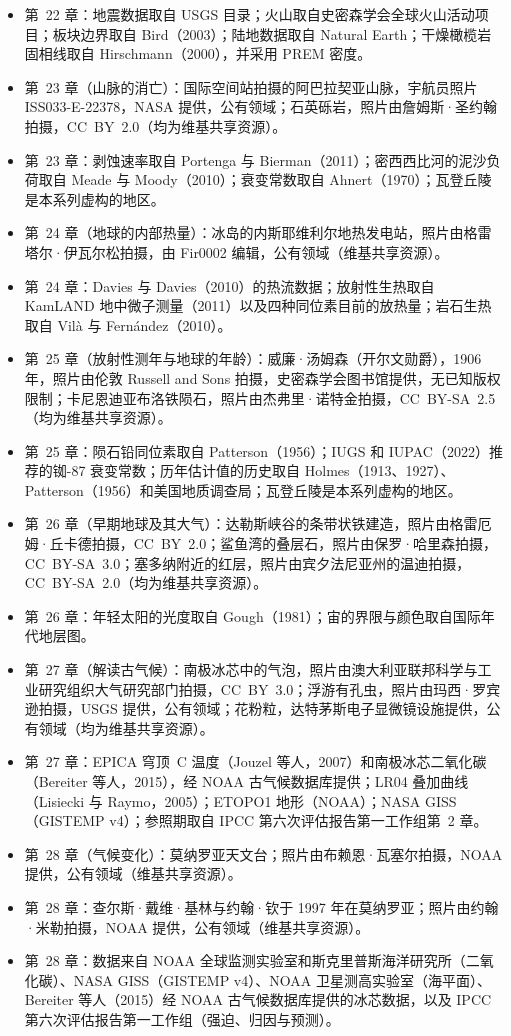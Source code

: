 \begin{itemize}
  \item 第~22 章：地震数据取自 USGS 目录；火山取自史密森学会全球火山活动项目；板块边界取自 Bird（2003）；陆地数据取自 Natural Earth；干燥橄榄岩固相线取自 Hirschmann（2000），并采用 PREM 密度。
  \item 第~23 章（山脉的消亡）：国际空间站拍摄的阿巴拉契亚山脉，宇航员照片 ISS033-E-22378，NASA 提供，公有领域；石英砾岩，照片由詹姆斯·圣约翰拍摄，CC~BY~2.0（均为维基共享资源）。
  \item 第~23 章：剥蚀速率取自 Portenga 与 Bierman（2011）；密西西比河的泥沙负荷取自 Meade 与 Moody（2010）；衰变常数取自 Ahnert（1970）；瓦登丘陵是本系列虚构的地区。
  \item 第~24 章（地球的内部热量）：冰岛的内斯耶维利尔地热发电站，照片由格雷塔尔·伊瓦尔松拍摄，由 Fir0002 编辑，公有领域（维基共享资源）。
  \item 第~24 章：Davies 与 Davies（2010）的热流数据；放射性生热取自 KamLAND 地中微子测量（2011）以及四种同位素目前的放热量；岩石生热取自 Vilà 与 Fernández（2010）。
  \item 第~25 章（放射性测年与地球的年龄）：威廉·汤姆森（开尔文勋爵），1906 年，照片由伦敦 Russell and Sons 拍摄，史密森学会图书馆提供，无已知版权限制；卡尼恩迪亚布洛铁陨石，照片由杰弗里·诺特金拍摄，CC~BY-SA~2.5（均为维基共享资源）。
  \item 第~25 章：陨石铅同位素取自 Patterson（1956）；IUGS 和 IUPAC（2022）推荐的铷-87 衰变常数；历年估计值的历史取自 Holmes（1913、1927）、Patterson（1956）和美国地质调查局；瓦登丘陵是本系列虚构的地区。
  \item 第~26 章（早期地球及其大气）：达勒斯峡谷的条带状铁建造，照片由格雷厄姆·丘卡德拍摄，CC~BY~2.0；鲨鱼湾的叠层石，照片由保罗·哈里森拍摄，CC~BY-SA~3.0；塞多纳附近的红层，照片由宾夕法尼亚州的温迪拍摄，CC~BY-SA~2.0（均为维基共享资源）。
  \item 第~26 章：年轻太阳的光度取自 Gough（1981）；宙的界限与颜色取自国际年代地层图。
  \item 第~27 章（解读古气候）：南极冰芯中的气泡，照片由澳大利亚联邦科学与工业研究组织大气研究部门拍摄，CC~BY~3.0；浮游有孔虫，照片由玛西·罗宾逊拍摄，USGS 提供，公有领域；花粉粒，达特茅斯电子显微镜设施提供，公有领域（均为维基共享资源）。
  \item 第~27 章：EPICA 穹顶~C 温度（Jouzel 等人，2007）和南极冰芯二氧化碳（Bereiter 等人，2015），经 NOAA 古气候数据库提供；LR04 叠加曲线（Lisiecki 与 Raymo，2005）；ETOPO1 地形（NOAA）；NASA GISS（GISTEMP v4）；参照期取自 IPCC 第六次评估报告第一工作组第~2 章。
  \item 第~28 章（气候变化）：莫纳罗亚天文台；照片由布赖恩·瓦塞尔拍摄，NOAA 提供，公有领域（维基共享资源）。
  \item 第~28 章：查尔斯·戴维·基林与约翰·钦于 1997 年在莫纳罗亚；照片由约翰·米勒拍摄，NOAA 提供，公有领域（维基共享资源）。
  \item 第~28 章：数据来自 NOAA 全球监测实验室和斯克里普斯海洋研究所（二氧化碳）、NASA GISS（GISTEMP v4）、NOAA 卫星测高实验室（海平面）、Bereiter 等人（2015）经 NOAA 古气候数据库提供的冰芯数据，以及 IPCC 第六次评估报告第一工作组（强迫、归因与预测）。
\end{itemize}
